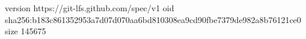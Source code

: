 version https://git-lfs.github.com/spec/v1
oid sha256:b183c861352953a7d07d070aa6bd810308ea9cd90fbe7379de982a8b76121ce0
size 145675

